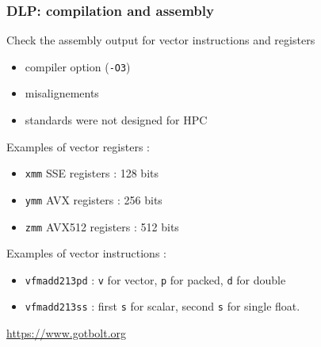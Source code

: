 \begin{frame}[containsverbatim]
\frametitle{DLP: compilation and assembly}
Check the assembly output for vector instructions and registers 
\begin{itemize}
\item compiler option (\texttt{-O3})
\item misalignements
\item standards were not designed for HPC
\end{itemize}
Examples of vector registers :
\begin{itemize}
\item \texttt{xmm} SSE registers : 128 bits
\item \texttt{ymm} AVX registers : 256 bits
\item \texttt{zmm} AVX512 registers : 512 bits
\end{itemize}
Examples of vector instructions :
\begin{itemize}
\item \texttt{vfmadd213pd} : \texttt{v} for vector, \texttt{p} for packed, \texttt{d} for double 
\item \texttt{vfmadd213ss} : first \texttt{s} for scalar, second \texttt{s} for single float.
\end{itemize}
\vfill
{\tiny \url{https://www.gotbolt.org}}
\end{frame}




